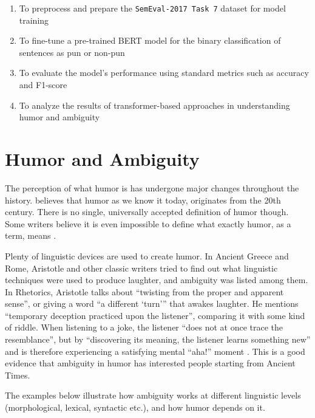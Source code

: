 \documentclass[11pt,a4paper]{article}
\begin{document}
\begin{enumerate}
    \item To preprocess and prepare the \texttt{SemEval-2017 Task 7} dataset for model training

    \item To fine-tune a pre-trained BERT model for the binary classification of sentences as pun or non-pun
    \item To evaluate the model’s performance using standard metrics such as accuracy and F1-score
    \item To analyze the results of transformer-based approaches in understanding humor and ambiguity
\end{enumerate}



\section{Humor and Ambiguity}

The perception of what humor is has undergone major changes throughout the history. \citet{larkin2017overview} believes that humor as we know it today, originates from the 20th century. There is no single, universally accepted definition of humor though. Some writers believe it is even impossible to define what exactly humor, as a term, means \citep{attardo1994linguistic}.
\vspace{4pt}

Plenty of linguistic devices are used to create humor. In Ancient Greece and Rome, Aristotle and other classic writers tried to find out what linguistic techniques were used to produce laughter, and ambiguity was listed among them. In Rhetorics, Aristotle talks about “twisting from the proper and apparent sense”, or giving a word “a different ‘turn’” that awakes laughter. He mentions “temporary deception practiced upon the listener”, comparing it with some kind of riddle. When listening to a joke, the listener “does not at once trace the resemblance”, but by “discovering its meaning, the listener learns something new” and is therefore experiencing a satisfying mental “aha!” moment \citep[][p.319-320]{aristotle2009rhetoric}. This is a good evidence that ambiguity in humor has interested people starting from Ancient Times.
\vspace{4pt}

The examples below illustrate how ambiguity works at different linguistic levels (morphological, lexical, syntactic etc.), and how humor depends on it.
\end{document}
